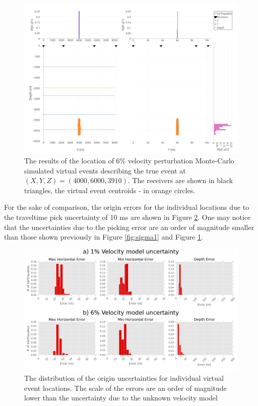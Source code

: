 \begin{figure}[htb]
\begin{center}
\includegraphics[width=0.85\linewidth,angle=0]{./AntonBiryukov_bibtex/Figure1_6pct.png}
\end{center}
\vspace{-4mm}
\caption{The results of the location of 6\% velocity perturbation Monte-Carlo simulated virtual events describing the true event at $(X,Y,Z) = (4000,6000,3910)$. The receivers are shown in black triangles, the virtual event centroids - in orange circles.}
\label{fig:sigma6}
\end{figure}

For the sake of comparison, the origin errors for the individual locations due to the traveltime pick uncertainty of 10 ms are shown in Figure \ref{fig:ind_error}. One may notice that the uncertainties due to the picking error are an order of magnitude smaller than those shown previously in Figure \ref{fig:sigma1} and Figure \ref{fig:sigma6}.

\begin{figure}[htb]
\begin{center}
\includegraphics[width=0.85\linewidth,angle=0]{./AntonBiryukov_bibtex/figure_inderr.png}
\end{center}
\vspace{-4mm}
\caption{The distribution of the origin uncertainties for individual virtual event locations. The scale of the errors are an order of magnitude lower than the uncertainty due to the unknown velocity model}
\label{fig:ind_error}
\end{figure}

